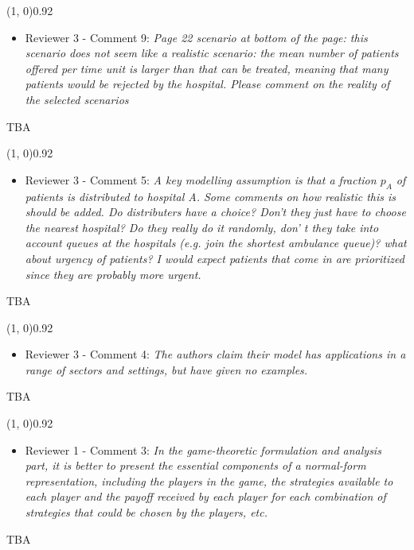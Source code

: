 \documentclass{article}
\begin{document}
    \line(1, 0){0.92\textwidth}
    \begin{itemize}
        \item Reviewer 3 - Comment 9: \textit{Page 22 scenario at bottom of
        the page: this scenario does not seem like a realistic scenario:
        the mean number of patients offered per time unit is larger than
        that can be treated, meaning that many patients would be rejected
        by the hospital. Please comment on the reality of the selected
        scenarios}
    \end{itemize}
    TBA %

    \line(1, 0){0.92\textwidth}
    \begin{itemize}
        \item Reviewer 3 - Comment 5: \textit{A key modelling assumption is
        that a fraction \(p_A\) of patients is distributed to hospital A.
        Some comments on how realistic this is should be added. Do
        distributers have a choice? Don't they just have to choose the
        nearest hospital? Do they really do it randomly, don' t they take
        into account queues at the hospitals (e.g. join the shortest
        ambulance queue)? what about urgency of patients? I would expect
        patients that come in are prioritized since they are probably more
        urgent.}
    \end{itemize}
    TBA %

    \line(1, 0){0.92\textwidth}
    \begin{itemize}
        \item Reviewer 3 - Comment 4: \textit{The authors claim their model
        has applications in a range of sectors and settings, but have given
        no examples.}
    \end{itemize}
    TBA %

    \line(1, 0){0.92\textwidth}
    \begin{itemize}
        \item Reviewer 1 - Comment 3: \textit{In the game-theoretic
        formulation and analysis part, it is better to present the
        essential components of a normal-form representation, including the
        players in the game, the strategies available to each player and the
        payoff received by each player for each combination of strategies
        that could be chosen by the players, etc.}
    \end{itemize}
    TBA %
\end{document}
